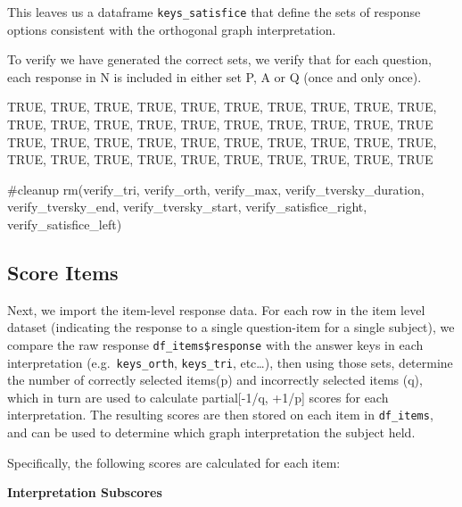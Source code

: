\documentclass[
  letterpaper,
  DIV=11,
  numbers=noendperiod]{scrreprt}
\newenvironment{Shaded}{\begin{snugshade}}{\end{snugshade}}
\newcommand{\CommentTok}[1]{\textcolor[rgb]{0.37,0.37,0.37}{#1}}
\newcommand{\FunctionTok}[1]{\textcolor[rgb]{0.28,0.35,0.67}{#1}}
\newcommand{\NormalTok}[1]{\textcolor[rgb]{0.00,0.23,0.31}{#1}}
\begin{document}
This leaves us a dataframe \texttt{keys\_satisfice} that define the sets
of response options consistent with the orthogonal graph interpretation.

To verify we have generated the correct sets, we verify that for each
question, each response in N is included in either set P, A or Q (once
and only once).

TRUE, TRUE, TRUE, TRUE, TRUE, TRUE, TRUE, TRUE, TRUE, TRUE, TRUE, TRUE,
TRUE, TRUE, TRUE, TRUE, TRUE, TRUE, TRUE, TRUE TRUE, TRUE, TRUE, TRUE,
TRUE, TRUE, TRUE, TRUE, TRUE, TRUE, TRUE, TRUE, TRUE, TRUE, TRUE, TRUE,
TRUE, TRUE, TRUE, TRUE

\begin{Shaded}
\begin{Highlighting}[]
\CommentTok{\#cleanup}
\FunctionTok{rm}\NormalTok{(verify\_tri, verify\_orth, verify\_max, verify\_tversky\_duration, verify\_tversky\_end, verify\_tversky\_start, verify\_satisfice\_right, verify\_satisfice\_left)}
\end{Highlighting}
\end{Shaded}

\hypertarget{score-items}{%
\subsection{Score Items}\label{score-items}}

Next, we import the item-level response data. For each row in the item
level dataset (indicating the response to a single question-item for a
single subject), we compare the raw response
\texttt{df\_items\$response} with the answer keys in each interpretation
(e.g.~\texttt{keys\_orth}, \texttt{keys\_tri}, etc\ldots), then using
those sets, determine the number of correctly selected items(p) and
incorrectly selected items (q), which in turn are used to calculate
partial{[}-1/q, +1/p{]} scores for each interpretation. The resulting
scores are then stored on each item in \texttt{df\_items}, and can be
used to determine which graph interpretation the subject held.

Specifically, the following scores are calculated for each item:

\textbf{Interpretation Subscores}
\end{document}
